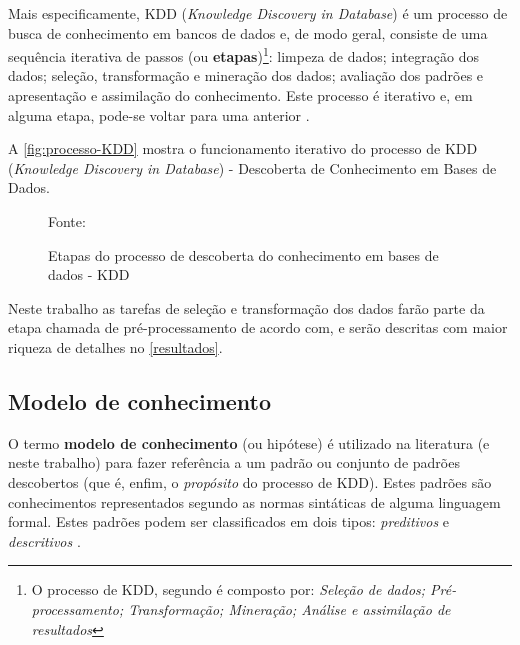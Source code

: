Mais especificamente, KDD (\textit{Knowledge Discovery in Database}) é um processo de busca de conhecimento em bancos de dados e, de modo geral, consiste de uma sequência iterativa de passos (ou \textbf{etapas})\footnote{O processo de KDD, segundo \cite{fayyad1996} é composto por: \textit{Seleção de dados; Pré-processamento; Transformação; Mineração; Análise e assimilação de resultados}}: limpeza de dados; integração dos dados; seleção, transformação e mineração dos dados; avaliação dos padrões e apresentação e assimilação do conhecimento. Este processo é iterativo e, em alguma etapa, pode-se voltar para uma anterior \cite{Boscarioli2017}.

A \autoref{fig:processo-KDD} mostra o funcionamento iterativo do processo de KDD (\textit{Knowledge Discovery in Database}) -  Descoberta de Conhecimento em Bases de Dados.

\begin{figure}[h!]
	\centering
	\caption{Etapas do processo de descoberta do conhecimento em bases de dados - KDD}
	
	{\scriptsize Fonte: }
	\label{fig:processo-KDD}
\end{figure}

Neste trabalho as tarefas de seleção e transformação dos dados farão parte da etapa chamada de pré-processamento de acordo com,  e serão descritas com maior riqueza de detalhes no \autoref{resultados}.

\subsection{Modelo de conhecimento}\label{modelo_conhecimento}
O termo \textbf{modelo de conhecimento} (ou hipótese) é utilizado na literatura (e neste trabalho) para fazer referência a um padrão ou conjunto de padrões descobertos (que é, enfim, o \textit{propósito} do processo de KDD). Estes padrões são conhecimentos representados segundo as normas sintáticas de alguma linguagem formal. Estes padrões podem ser classificados em dois tipos: \textit{preditivos} e \textit{descritivos} \cite{ferrari2017}.

